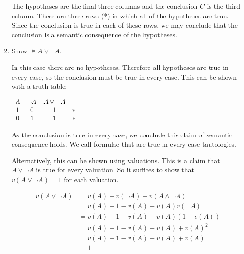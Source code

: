 \documentclass[11pt]{report}
\begin{document}
\begin{enumerate}
	The hypotheses are the final three columns and the conclusion $C$ is the third column. There are three rows (*) in which all of the hypotheses are true. Since the conclusion is true in each of these rows, we may conclude that the conclusion is a semantic consequence of the hypotheses. 
	
	\item Show $\models A \lor \lnot A$.

	\hspace{0.2cm}{\bf Solution}

	In this case there are no hypotheses. Therefore all hypotheses are true in every case, so the conclusion must be true in every case. This can be shown with a truth table: 

	\begin{center}
		$\begin{array}{c c c c}
			A & \lnot A & A \lor \lnot A & \ \\
			1 & 0 & 1 & * \\
			0 & 1 & 1 & * 
		\end{array}$
	\end{center}

	As the conclusion is true in every case, we conclude this claim of semantic consequence holds. We call formulae that are true in every case tautologies. 

	Alternatively, this can be shown using valuations. This is a claim that $A \lor \lnot A$ is true for every valuation. So it suffices to show that $v(A \lor \lnot A) = 1$ for each valuation. 

	\begin{equation*}
		\begin{split}
			v(A \lor \lnot A) &= v(A) + v(\lnot A) - v(A \land \lnot A) \\ 
			&= v(A) + 1 - v(A) - v(A)v(\lnot A)\\
			&= v(A) + 1 - v(A) - v(A)(1 - v(A))\\
			&= v(A) + 1 - v(A) - v(A) + v(A)^{2}\\
			&= v(A) + 1 - v(A) - v(A) + v(A)\\
			&= 1	
		\end{split}
	\end{equation*}


\end{enumerate}
\end{document}
